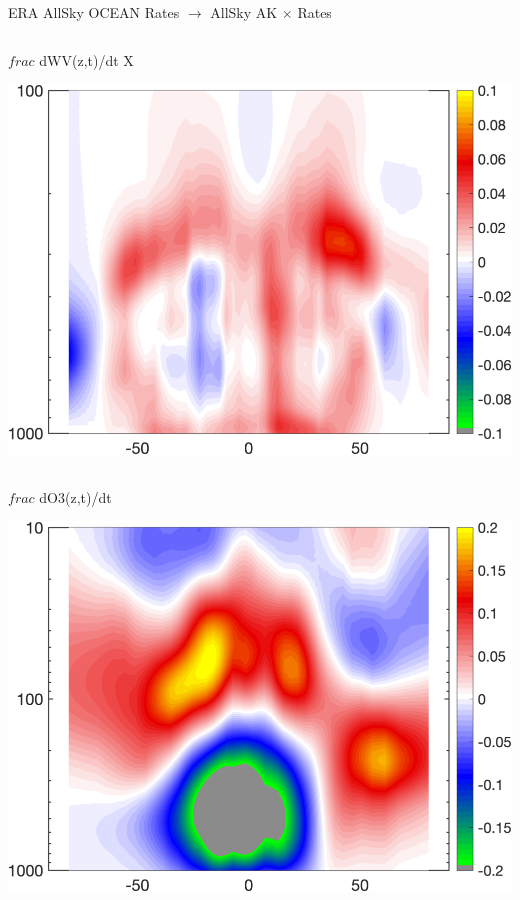 \documentclass[10pt,t]{beamer}
\begin{document}
\begin{frame}{ERA AllSky OCEAN Rates $\rightarrow$ AllSky AK $\times$ Rates}
\begin{columns}
\begin{column}{0.45\columnwidth}
\begin{block}{\footnotesize $frac$ dWV(z,t)/dt}
\vspace{-0.1in}
X\begin{center}
\includegraphics[width=\linewidth]{Figs/CloudAnom/Desc_ocean/ak_x_ERAwvrates.png}
\end{center}
\end{block}
\end{column}
\end{columns}

\vspace{-0.25in}

\begin{columns}
\begin{column}{0.45\columnwidth}
\begin{block}{\footnotesize $frac$ dO3(z,t)/dt}
\vspace{-0.1in}
\begin{center}
\includegraphics[width=\linewidth]{Figs/CloudAnom/Desc_ocean/ak_x_ERAo3rates.png}
\end{center}
\end{block}
\end{column}


\end{columns}
\end{frame}
\end{document}
